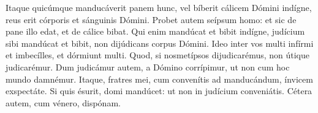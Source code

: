 

    Itaque quicúmque manducáverit panem hunc, vel bíberit cálicem Dómini indígne,
    reus erit córporis et sánguinis Dómini. Probet autem seípsum homo: et sic de
    pane illo edat, et de cálice bibat. Qui enim mandúcat et bibit indígne,
    judícium sibi mandúcat et bibit, non dijúdicans corpus Dómini. Ideo inter vos
    multi infírmi et imbecílles, et dórmiunt multi. Quod, si nosmetípsos
    dijudicarémus, non útique judicarémur. Dum judicámur autem, a Dómino
    corrípimur, ut non cum hoc mundo damnémur. Itaque, fratres mei, cum convenítis
    ad manducándum, ínvicem exspectáte. Si quis ésurit, domi mandúcet: ut non in
    judícium conveniátis. Cétera autem, cum vénero, dispónam.

